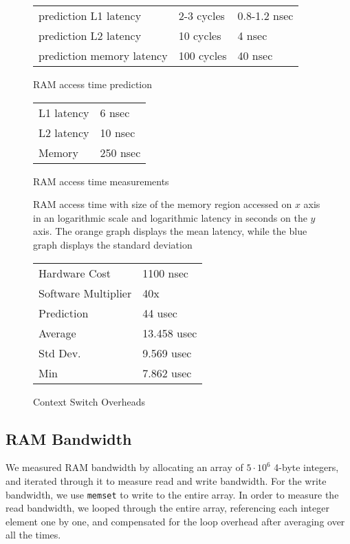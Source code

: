 \documentclass[letterpaper,twocolumn,10pt]{article}
\begin{document}
\begin{figure}
	\centering
	
	\begin{tabular}{lll}
		prediction L1 latency  & 2-3 cycles & 0.8-1.2 nsec  \\
		prediction L2 latency  & 10 cycles  & 4 nsec \\
		prediction memory latency  & 100 cycles   & 40 nsec \\
	\end{tabular}
	\caption{RAM access time prediction}
	\label{tab:accesstimepred}
\end{figure}

\begin{figure}
	\centering

	\begin{tabular}{ll}
		L1 latency  & 6 nsec  \\
		L2 latency  & 10 nsec  \\
		Memory   & 250 nsec   \\
	\end{tabular}
	\caption{RAM access time measurements}
	\label{tab:accesstime}
\end{figure}

\begin{figure}
	\centering
	
	\caption{RAM access time with size of the memory region accessed on $x$  axis in an logarithmic scale and logarithmic latency in seconds on the $y$ axis. The orange graph displays the mean latency, while the blue graph displays the standard deviation}
	\label{fig:memlatency}
\end{figure}

\begin{figure}
	\centering
\begin{tabular}{ll}
Hardware Cost  & 1100 nsec  \\
Software Multiplier  & 40x   \\
Prediction  & 44 usec    \\
Average  & 13.458 usec    \\
Std Dev. & 9.569 usec     \\
Min      & 7.862 usec   
\end{tabular}
\caption{Context Switch Overheads}
\label{tab:conswitchoverheads}
\end{figure}

\subsection{RAM Bandwidth}
We measured RAM bandwidth by allocating an array of $5 \cdot 10^6$ 4-byte
integers, and iterated through it to measure read and write bandwidth. For the
write bandwidth, we use \texttt{memset} to write to the entire array. In order
to measure the read bandwidth, we looped through the entire array, referencing
each integer element one by one, and compensated for the loop overhead after
averaging over all the times.
\end{document}

